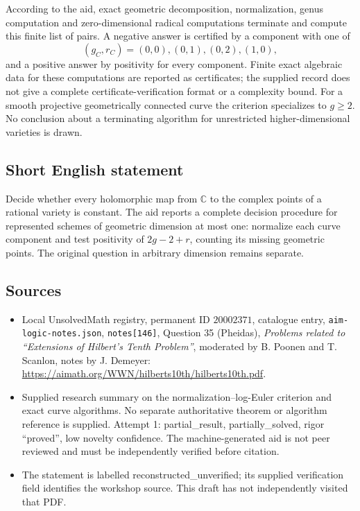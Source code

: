 \documentclass[11pt]{article}
\newcommand{\C}{\mathbb{C}}
\begin{document}
According to the aid, exact geometric decomposition, normalization, genus computation and zero-dimensional radical computations terminate and compute this finite list of pairs. A negative answer is certified by a component with one of
\[
 (g_C,r_C)=(0,0),(0,1),(0,2),(1,0),
\]
and a positive answer by positivity for every component. Finite exact algebraic data for these computations are reported as certificates; the supplied record does not give a complete certificate-verification format or a complexity bound. For a smooth projective geometrically connected curve the criterion specializes to \(g\geq2\). No conclusion about a terminating algorithm for unrestricted higher-dimensional varieties is drawn.
\subsection{Short English statement}
Decide whether every holomorphic map from \(\C\) to the complex points of a rational variety is constant. The aid reports a complete decision procedure for represented schemes of geometric dimension at most one: normalize each curve component and test positivity of \(2g-2+r\), counting its missing geometric points. The original question in arbitrary dimension remains separate.
\subsection{Sources}
\begin{itemize}
\item Local UnsolvedMath registry, permanent ID \(20002371\), catalogue entry, \texttt{aim-logic-notes.json}, \texttt{notes[146]}, Question 35 (Pheidas), \emph{Problems related to ``Extensions of Hilbert's Tenth Problem''}, moderated by B. Poonen and T. Scanlon, notes by J. Demeyer: \url{https://aimath.org/WWN/hilberts10th/hilberts10th.pdf}.
\item Supplied research summary on the normalization--log-Euler criterion and exact curve algorithms. No separate authoritative theorem or algorithm reference is supplied. Attempt 1: partial\_result, partially\_solved, rigor ``proved'', low novelty confidence. The machine-generated aid is not peer reviewed and must be independently verified before citation.
\item The statement is labelled reconstructed\_unverified; its supplied verification field identifies the workshop source. This draft has not independently visited that PDF.
\end{itemize}
\end{document}
